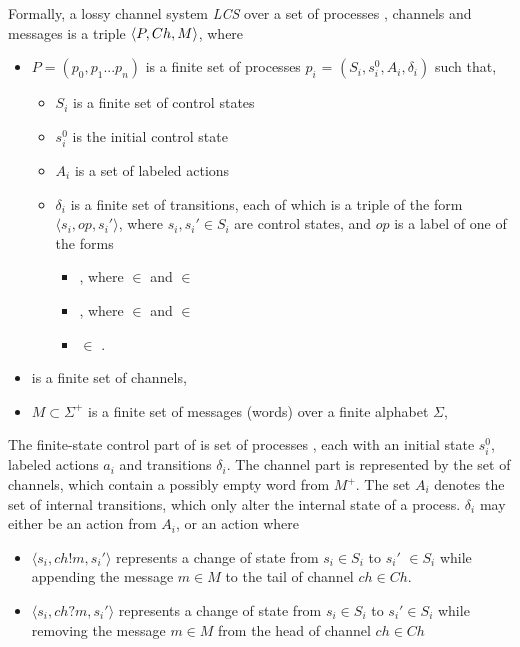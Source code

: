 \label{CS}
Formally, a lossy channel system \emph{LCS} over a set of processes , channels  and messages  is a triple $\langle P,Ch,M\rangle$, where
\begin{itemize}
\item[] $P = (p_0,p_1...p_n)$ is a finite set of processes $p_i$ = $(S_i, s_i^0, A_i, \delta_i)$ such that,
  \begin{itemize}
    \item $S_i$ is a finite set of control states
    \item $s_i^0$ is the initial control state
    \item $A_i$ is a set of labeled actions
    \item $\delta_i$ is a finite set of transitions, each of which is a triple of the form $\langle s_i,op,s_i'\rangle$, where $s_i, s_i'\in S_i$ are control states, and $op$ is a label of one of the forms
    \begin{itemize}
      \item {}, where  $\in$  and  $\in$ 
      \item {}, where  $\in$  and  $\in$ 
      \item {} $\in$ .
    \end{itemize}
\end{itemize}
\item[]  is a finite set of channels,
\item[] $M \subset \Sigma^+$ is a finite set of messages (words) over a finite alphabet $\Sigma$,
\end{itemize}

The finite-state control part of  is set of processes , each with an initial state $s_i^0$, labeled actions $a_i$ and transitions $\delta_i$. The channel part is represented by the set  of channels, which contain a possibly empty word from $M^+$. The set $A_i$ denotes the set of internal transitions, which only alter the internal state of a process. $\delta_i$ may either be an action from $A_i$, or an action where

\begin{itemize}
\item[]
$\langle s_i, ch!m, s_i'\rangle$ represents a change of state from $s_i \in S_i$ to $s_i'$ $\in S_i$ while appending the message $m\in M$ to the tail of channel $ch\in Ch$.
\item[]
$\langle s_i, ch?m, s_i'\rangle$ represents a change of state from $s_i\in S_i$ to $s_i'\in S_i$ while removing the message $m\in M$ from the head of channel $ch \in Ch$
\end{itemize}

